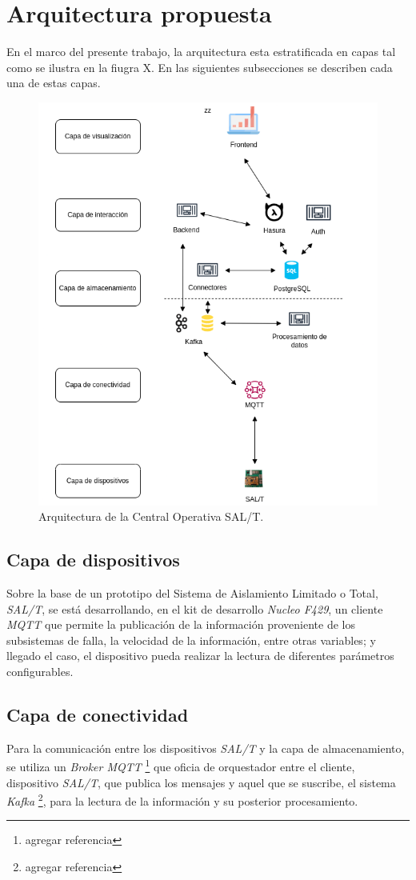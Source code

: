 \documentclass[a4paper]{IEEEtran}
\begin{document}
\section{Arquitectura propuesta}

En el marco del presente trabajo, la arquitectura esta estratificada en capas
tal como se ilustra en la fiugra X. En las siguientes subsecciones se describen cada una de estas capas.

\begin{figure}[ht]
\centering 
\includegraphics[width=.5\textwidth]{diagram.png}
\caption{ \normalsize Arquitectura de la Central Operativa SAL/T.}
\label{fig:diagBloques}
\end{figure}


\subsection{Capa de dispositivos}

Sobre la base de un prototipo del Sistema de Aislamiento Limitado o Total, \textit{SAL/T}, se está desarrollando, en el kit de desarrollo \textit{Nucleo F429}, un cliente \textit{MQTT} que permite la publicación de la información proveniente de los subsistemas de falla, la velocidad de la información, entre otras variables; y llegado el caso, el dispositivo pueda realizar la lectura de diferentes parámetros configurables.

\subsection{Capa de conectividad}

Para la comunicación entre los dispositivos \textit{SAL/T} y la capa de almacenamiento, se utiliza un \textit{Broker MQTT} \cite{b3} \footnote{agregar referencia} que oficia de orquestador entre el cliente, dispositivo \textit{SAL/T}, que publica los mensajes y aquel que se suscribe, el sistema \textit{Kafka} \cite{b4} \footnote{agregar referencia}, para la lectura de la información y su posterior procesamiento. 
\end{document}
